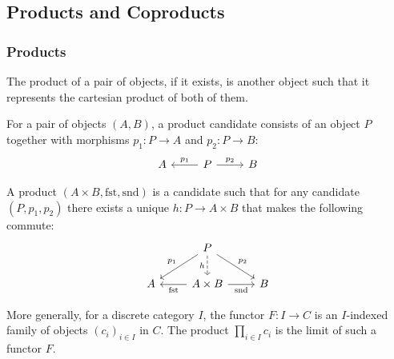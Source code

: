 \subsection{Products and Coproducts}

\subsubsection*{Products}
The product of a pair of objects, if it exists, is another object such that it
represents the cartesian product of both of them.

\begin{definition}

	For a pair of objects $(A, B)$, a product candidate consists of an object $P$
	together with morphisms $p_1: P\to A$ and $p_2:P\to B$:
	\[\begin{tikzcd}[ampersand replacement=\&]
		A \& P \& B
		\arrow["{p_1}"', from=1-2, to=1-1]
		\arrow["{p_2}", from=1-2, to=1-3]
	\end{tikzcd}\]

	A product $(A\times B, \mathrm{fst}, \mathrm{snd})$ is a candidate such that
	for any candidate $(P, p_1, p_2)$ there exists a unique $h: P\to A\times B$
	that makes the following commute:
	\parencite{leinster:basic_category_theory}
	\[\begin{tikzcd}[ampersand replacement=\&]
		\& P \\
		A \& {A\times B} \& B
		\arrow["{\mathrm{fst}}", from=2-2, to=2-1]
		\arrow["{\mathrm{snd}}"', from=2-2, to=2-3]
		\arrow["{p_1}"', from=1-2, to=2-1]
		\arrow["{p_2}", from=1-2, to=2-3]
		\arrow["h"', dashed, from=1-2, to=2-2]
	\end{tikzcd}\]
\end{definition}

\begin{definition}

	More generally, for a discrete category $I$, the functor $F:I\to C$ is an
	$I$-indexed family of objects $(c_i)_{i\in I}$ in $C$. The product
	$\prod_{i\in I} c_i$ is the limit of such a functor $F$.
	\parencite{leinster:basic_category_theory}
\end{definition}

